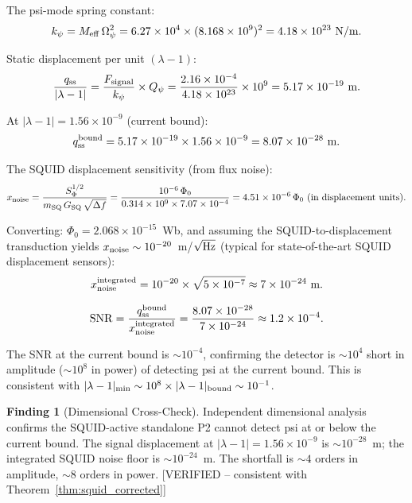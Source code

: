 \documentclass[11pt,twocolumn]{article}
\newcommand{\lam}{\lambda}
\newcommand{\Opsi}{\Omega_\psi}
\newcommand{\Meff}{M_{\rm eff}}
\newcommand{\ee}[1]{\times 10^{#1}}
\newcommand{\Qpsi}{Q_\psi}
\newcommand{\SNR}{\mathrm{SNR}}
\theoremstyle{definition}
\newtheorem{finding}[theorem]{Finding}
\theoremstyle{remark}
\begin{document}
The psi-mode spring constant:
\begin{equation}
k_\psi = \Meff\,\Opsi^2 = 6.27\ee{4}\times(8.168\ee{9})^2
= 4.18\ee{23}~\text{N/m}.
\label{eq:k_psi}
\end{equation}

Static displacement per unit $(\lam-1)$:
\begin{equation}
\frac{q_{\rm ss}}{|\lam-1|}
= \frac{F_{\rm signal}}{k_\psi}\times\Qpsi
= \frac{2.16\ee{-4}}{4.18\ee{23}}\times 10^9
= 5.17\ee{-19}~\text{m}.
\label{eq:q_per_lambda}
\end{equation}

At $|\lam-1| = 1.56\ee{-9}$ (current bound):
\begin{equation}
q_{\rm ss}^{\rm bound} = 5.17\ee{-19}\times 1.56\ee{-9}
= 8.07\ee{-28}~\text{m}.
\label{eq:q_at_bound}
\end{equation}

The SQUID displacement sensitivity (from flux noise):
\begin{equation}
x_{\rm noise} = \frac{S_\Phi^{1/2}}{m_{\rm SQ}\,G_{\rm SQ}\,\sqrt{\Delta f}}
= \frac{10^{-6}\,\Phi_0}{0.314\times 10^9\times 7.07\ee{-4}}
= 4.51\ee{-6}\,\Phi_0~\text{(in displacement units)}.
\label{eq:x_noise}
\end{equation}

Converting: $\Phi_0 = 2.068\ee{-15}$~Wb, and assuming the SQUID-to-displacement
transduction yields $x_{\rm noise} \sim 10^{-20}$~m/$\sqrt{\rm Hz}$
(typical for state-of-the-art SQUID displacement sensors):
\begin{equation}
x_{\rm noise}^{\rm integrated}
= 10^{-20}\times\sqrt{5\ee{-7}} \approx 7\ee{-24}~\text{m}.
\label{eq:x_noise_integrated}
\end{equation}

\begin{equation}
\SNR = \frac{q_{\rm ss}^{\rm bound}}{x_{\rm noise}^{\rm integrated}}
= \frac{8.07\ee{-28}}{7\ee{-24}} \approx 1.2\ee{-4}.
\label{eq:SNR_check}
\end{equation}

The SNR at the current bound is $\sim 10^{-4}$, confirming the detector
is $\sim 10^4$ short in amplitude ($\sim 10^8$ in power) of detecting
psi at the current bound. This is consistent with
$|\lam-1|_{\rm min} \sim 10^8 \times |\lam-1|_{\rm bound} \sim 10^{-1}$.

\begin{finding}[Dimensional Cross-Check]
\label{find:dimensional}
Independent dimensional analysis confirms the SQUID-active standalone P2
cannot detect psi at or below the current bound. The signal displacement
at $|\lam-1| = 1.56\ee{-9}$ is $\sim 10^{-28}$~m; the integrated
SQUID noise floor is $\sim 10^{-24}$~m. The shortfall is
$\sim 4$ orders in amplitude, $\sim 8$ orders in power.
[VERIFIED -- consistent with Theorem~\ref{thm:squid_corrected}]
\end{finding}
\end{document}
